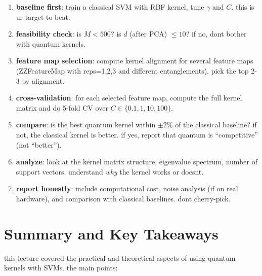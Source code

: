 \documentclass[11pt,a4paper]{article}
\theoremstyle{definition}
\theoremstyle{remark}
\begin{document}
\begin{enumerate}[leftmargin=*]
    \item \textbf{baseline first}: train a classical SVM with RBF kernel, tune $\gamma$ and $C$. this is ur target to beat.

    \item \textbf{feasibility check}: is $M < 500$? is $d$ (after PCA) $\leq 10$? if no, dont bother with quantum kernels.

    \item \textbf{feature map selection}: compute kernel alignment for several feature maps (ZZFeatureMap with reps=1,2,3 and different entanglements). pick the top 2-3 by alignment.

    \item \textbf{cross-validation}: for each selected feature map, compute the full kernel matrix and do 5-fold CV over $C \in \{0.1, 1, 10, 100\}$.

    \item \textbf{compare}: is the best quantum kernel within $\pm 2\%$ of the classical baseline? if not, the classical kernel is better. if yes, report that quantum is ``competitive'' (not ``better'').

    \item \textbf{analyze}: look at the kernel matrix structure, eigenvalue spectrum, number of support vectors. understand \emph{why} the kernel works or doesnt.

    \item \textbf{report honestly}: include computational cost, noise analysis (if on real hardware), and comparison with classical baselines. dont cherry-pick.
\end{enumerate}

\section{Summary and Key Takeaways}

this lecture covered the practical and theoretical aspects of using quantum kernels with SVMs. the main points:
\end{document}
